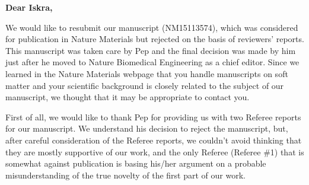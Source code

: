 \documentclass[11pt,a4paper]{article}
\begin{document}




\noindent
{\bf Dear Iskra,}
\vskip 0.7cm

We would like to resubmit our manuscript (NM15113574), which was considered for publication in Nature Materials but rejected on the basis of reviewers' reports. 
This manuscript was taken care by Pep and the final decision was made by him just after he moved to Nature Biomedical Engineering as a chief editor. 
Since we learned in the Nature Materials webpage that you handle manuscripts on soft matter and your scientific background is closely related to the subject of our manuscript, we thought that it may be appropriate to contact you.  

First of all, we would like to thank Pep for providing us with two Referee reports for our manuscript. 
We understand his decision to reject the manuscript, but, after careful consideration of the Referee reports, we couldn't avoid thinking that they are mostly supportive of our work, and the only Referee (Referee \#1) that is somewhat against publication is basing his/her argument on a probable misunderstanding of the true novelty of the first part of our work.
\end{document}
